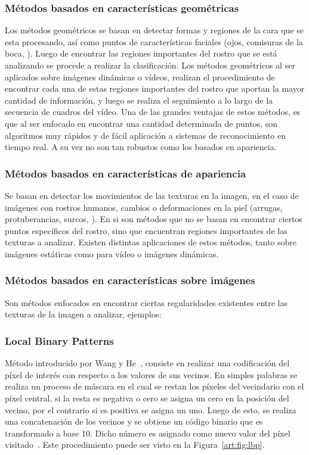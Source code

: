 \subsubsection{Métodos basados en características geométricas}
\label{sec:met_geo}
Los métodos geométricos se basan en detectar formas y regiones de la cara que se esta procesando, así como puntos de características faciales (\eg ojos, comisuras de la boca, \etc). 
Luego de encontrar las regiones importantes del rostro que se está analizando se procede a realizar la clasificación. Los métodos geométricos al ser aplicados sobre imágenes dinámicas o vídeos, realizan el procedimiento de encontrar cada una de estas regiones importantes del rostro que aportan la mayor cantidad de información, y luego se realiza el seguimiento a lo largo de la secuencia de cuadros del vídeo. Una de las grandes ventajas de estos métodos, es que al ser enfocado en encontrar una cantidad determinada de puntos, son algoritmos muy rápidos y de fácil aplicación a sistemas de reconocimiento en tiempo real. A su vez no son tan robustos como los basados en apariencia.


\subsubsection{Métodos basados en características de apariencia}
\label{sec:met_apa}
Se basan en detectar los movimientos de las texturas en la imagen, en el caso de imágenes con rostros humanos, cambios o deformaciones en la piel (\eg arrugas, protuberancias, surcos, \etc). En si son métodos que no se basan en encontrar ciertos puntos específicos del rostro, sino que encuentran regiones importantes de las texturas a analizar. Existen distintas aplicaciones de estos métodos, tanto sobre imágenes estáticas como para vídeo o imágenes dinámicas.  

	\subsubsection{Métodos basados en características sobre imágenes}
	\label{sec:met_imagen}
		Son métodos enfocados en encontrar ciertas regularidades existentes entre las texturas de la imagen a analizar, ejemplos:

		\subsubsection{Local Binary Patterns}
		\label{sec:lbp}
		Método introducido por Wang y He~\cite{Wang1990}, consiste en realizar una codificación del píxel de interés con respecto a los valores de sus vecinos. En simples palabras se realiza un proceso de máscara en el cual se restan los píxeles del vecindario con el píxel central, si la resta es negativa o cero se asigna un cero en la posición del vecino, por el contrario si es positiva se asigna un uno. Luego de esto, se realiza una concatenación de los vecinos y se obtiene un código binario que es transformado a base 10. Dicho número es asignado como nuevo valor del píxel visitado~\cite{Ojala1994,Ojala2002,Ahonen2004,Shan2009}. Este procedimiento puede ser visto en la Figura~\ref{art:fig:lbp}.
		
